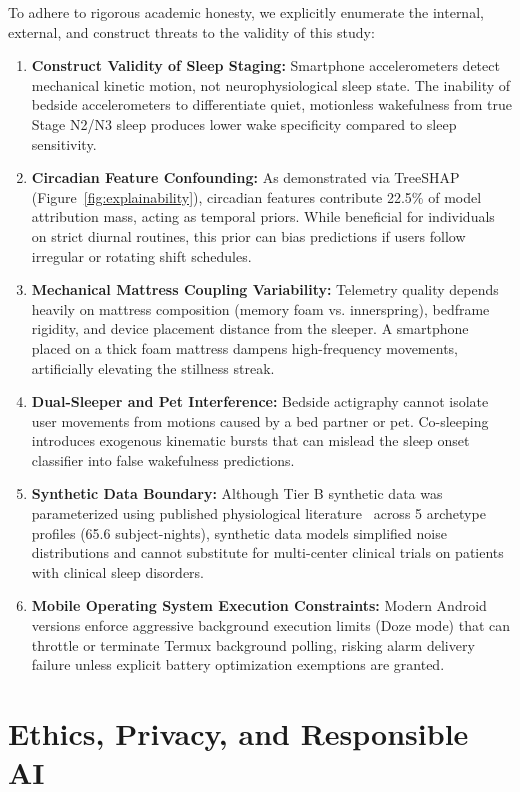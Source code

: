 \documentclass[journal,11pt,onecolumn]{IEEEtran}
\begin{document}
To adhere to rigorous academic honesty, we explicitly enumerate the internal, external, and construct threats to the validity of this study:
\begin{enumerate}[leftmargin=*]
    \item \textbf{Construct Validity of Sleep Staging:} Smartphone accelerometers detect mechanical kinetic motion, not neurophysiological sleep state. The inability of bedside accelerometers to differentiate quiet, motionless wakefulness from true Stage N2/N3 sleep produces lower wake specificity compared to sleep sensitivity.
    \item \textbf{Circadian Feature Confounding:} As demonstrated via TreeSHAP (Figure~\ref{fig:explainability}), circadian features contribute 22.5\% of model attribution mass, acting as temporal priors. While beneficial for individuals on strict diurnal routines, this prior can bias predictions if users follow irregular or rotating shift schedules.
    \item \textbf{Mechanical Mattress Coupling Variability:} Telemetry quality depends heavily on mattress composition (memory foam vs. innerspring), bedframe rigidity, and device placement distance from the sleeper. A smartphone placed on a thick foam mattress dampens high-frequency movements, artificially elevating the stillness streak.
    \item \textbf{Dual-Sleeper and Pet Interference:} Bedside actigraphy cannot isolate user movements from motions caused by a bed partner or pet. Co-sleeping introduces exogenous kinematic bursts that can mislead the sleep onset classifier into false wakefulness predictions.
    \item \textbf{Synthetic Data Boundary:} Although Tier B synthetic data was parameterized using published physiological literature~\cite{carskadon2011normal, basner2008american} across 5 archetype profiles (65.6 subject-nights), synthetic data models simplified noise distributions and cannot substitute for multi-center clinical trials on patients with clinical sleep disorders.
    \item \textbf{Mobile Operating System Execution Constraints:} Modern Android versions enforce aggressive background execution limits (Doze mode) that can throttle or terminate Termux background polling, risking alarm delivery failure unless explicit battery optimization exemptions are granted.
\end{enumerate}

\section{Ethics, Privacy, and Responsible AI}
\label{sec:ethics}
\end{document}
